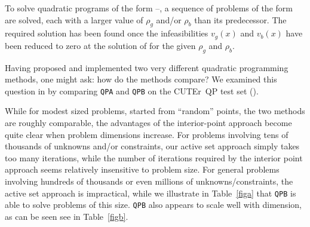 \documentclass[twoside]{article}
\newcommand{\cuter}{{\sf CUTEr}}
\begin{document}
To solve quadratic programs of the form --, 
a sequence of problems of the form  are
solved, each with a larger value of $\rho_g$ and/or $\rho_b$ 
than its predecessor. The
required solution has been found once the infeasibilities 
$v_g(x)$ and $v_b(x)$ have been reduced to zero at the solution of 
 for the given $\rho_g$ and $\rho_b$.

Having proposed and implemented two very different quadratic programming
methods, one might ask: how do the methods compare? We examined
this question in  by comparing {\tt QPA} and {\tt QPB}
on the \cuter\ QP test set ().

While for modest sized problems, started from ``random'' points, the two
methods are roughly comparable, the advantages of the interior-point approach
become quite clear when problem dimensions increase. For problems involving
tens of thousands of unknowns and/or constraints, our active set approach
simply takes too many iterations, while the number of iterations 
required by the interior point approach seems relatively insensitive to 
problem size. For general problems involving hundreds of thousands or
even millions of unknowns/constraints, the active set approach is impractical,
while we illustrate in Table~\ref{figa} that
{\tt QPB} is able to solve problems of this size.
{\tt QPB} also appears to scale well with dimension, as can be seen 
see in Table~\ref{figb}.
\end{document}
